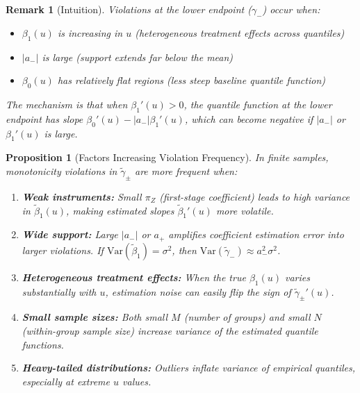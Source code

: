 \documentclass[12pt]{article}
\newtheorem{proposition}{Proposition}
\newtheorem{remark}{Remark}
\begin{document}
\begin{remark}[Intuition]
Violations at the \emph{lower} endpoint ($\gamma_-$) occur when:
\begin{itemize}
\item $\beta_1(u)$ is increasing in $u$ (heterogeneous treatment effects across quantiles)
\item $|a_-|$ is large (support extends far below the mean)
\item $\beta_0(u)$ has relatively flat regions (less steep baseline quantile function)
\end{itemize}
The mechanism is that when $\beta_1'(u) > 0$, the quantile function at the lower endpoint has slope $\beta_0'(u) - |a_-| \beta_1'(u)$, which can become negative if $|a_-|$ or $\beta_1'(u)$ is large.
\end{remark}

\begin{proposition}[Factors Increasing Violation Frequency]\label{prop:violation_factors}
In finite samples, monotonicity violations in $\tilde{\gamma}_\pm$ are more frequent when:
\begin{enumerate}
\item \textbf{Weak instruments:} Small $\pi_Z$ (first-stage coefficient) leads to high variance in $\tilde{\beta}_1(u)$, making estimated slopes $\tilde{\beta}_1'(u)$ more volatile.

\item \textbf{Wide support:} Large $|a_-|$ or $a_+$ amplifies coefficient estimation error into larger violations. If $\text{Var}(\tilde{\beta}_1) = \sigma^2$, then $\text{Var}(\tilde{\gamma}_-) \approx a_-^2 \sigma^2$.

\item \textbf{Heterogeneous treatment effects:} When the true $\beta_1(u)$ varies substantially with $u$, estimation noise can easily flip the sign of $\tilde{\gamma}_\pm'(u)$.

\item \textbf{Small sample sizes:} Both small $M$ (number of groups) and small $N$ (within-group sample size) increase variance of the estimated quantile functions.

\item \textbf{Heavy-tailed distributions:} Outliers inflate variance of empirical quantiles, especially at extreme $u$ values.
\end{enumerate}
\end{proposition}
\end{document}
